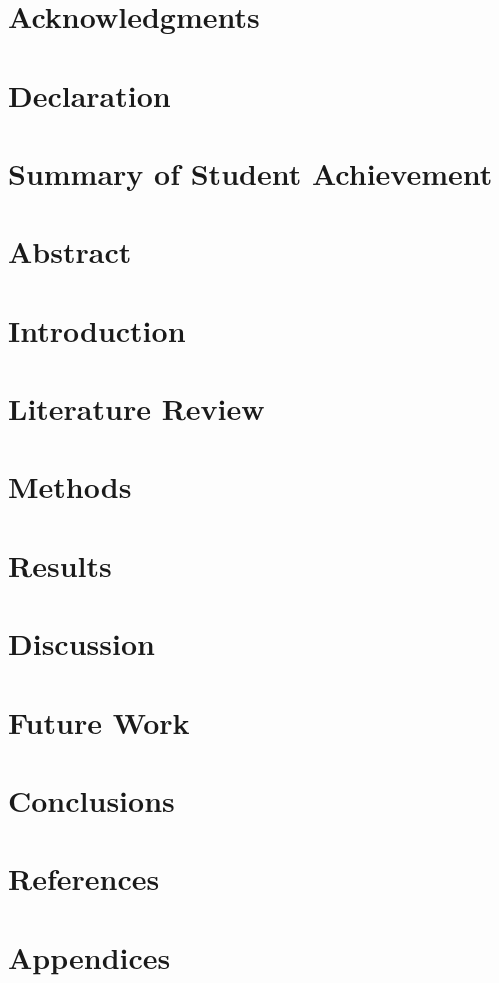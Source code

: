 \documentclass[12pt]{article}
\begin{document}

\restoregeometry

\section*{Acknowledgments}

\pagebreak

\section*{Declaration}

\pagebreak

\section*{Summary of Student Achievement}

\pagebreak

\setcounter{tocdepth}{5}
\tableofcontents
\pagebreak

\listoffigures
\listoftables
\pagebreak

\justify

\section*{Abstract}

\pagebreak
\printglossary

\section{Introduction}


\section{Literature Review}


\section{Methods}


\section{Results}


\section{Discussion}


\section{Future Work}


\section{Conclusions}




\section{References}
\label{sec:ref}

\section{Appendices}

\end{document}
